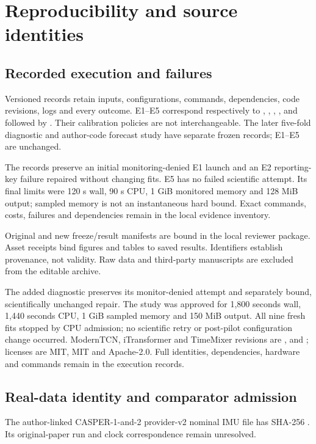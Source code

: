\section{Reproducibility and source identities}\label{app:provenance}
\subsection{Recorded execution and failures}
Versioned records retain inputs, configurations, commands, dependencies, code revisions, logs and every outcome. E1--E5 correspond respectively to , , , , and  followed by . Their calibration policies are not interchangeable. The later five-fold diagnostic and author-code forecast study have separate frozen records; E1--E5 are unchanged.

The records preserve an initial monitoring-denied E1 launch and an E2 reporting-key failure repaired without changing fits. E5 has no failed scientific attempt. Its final limits were 120 s wall, 90 s CPU, 1 GiB monitored memory and 128 MiB output; sampled memory is not an instantaneous hard bound. Exact commands, costs, failures and dependencies remain in the local evidence inventory.

Original and new freeze/result manifests are bound in the local reviewer package. Asset receipts bind figures and tables to saved results. Identifiers establish provenance, not validity. Raw data and third-party manuscripts are excluded from the editable archive.

The added  diagnostic preserves its monitor-denied attempt and separately bound, scientifically unchanged repair. The  study was approved for 1,800 seconds wall, 1,440 seconds CPU, 1 GiB sampled memory and 150 MiB output. All nine fresh fits stopped by CPU admission; no scientific retry or post-pilot configuration change occurred. ModernTCN, iTransformer and TimeMixer revisions are ,  and ; licenses are MIT, MIT and Apache-2.0. Full identities, dependencies, hardware and commands remain in the execution records.

\subsection{Real-data identity and comparator admission}
The author-linked CASPER-1-and-2 provider-v2 nominal IMU file has SHA-256 . Its original-paper run and clock correspondence remain unresolved.

